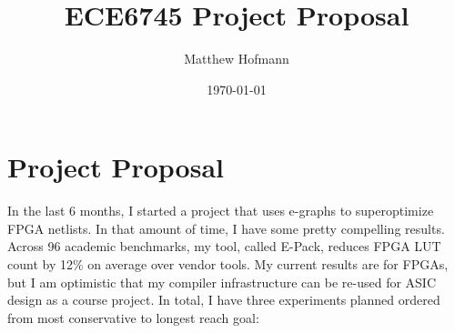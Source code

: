 \documentclass[10pt,letterpaper]{article}
\title{ECE6745 Project Proposal}
\author{Matthew Hofmann}
\date{\today}
\begin{document}
\maketitle

\section{Project Proposal}\label{sec:intro}

In the last 6 months, I started a project that uses e-graphs to superoptimize
FPGA netlists. In that amount of time, I have some pretty compelling results.
Across 96 academic benchmarks, my tool, called E-Pack, reduces FPGA LUT count
by 12\% on average over vendor tools. My current results are for FPGAs, but I
am optimistic that my compiler infrastructure can be re-used for ASIC design as
a course project. In total, I have three experiments planned ordered from most
conservative to longest reach goal:
\end{document}
